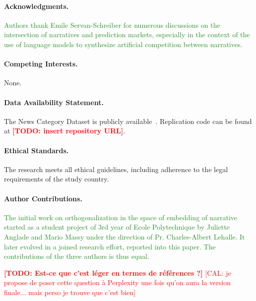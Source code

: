 \documentclass[
  journal=medium,
  manuscript=article-type,
  year=2025,
  volume=1,
]{cup-journal}
\newcommand{\TODO}[1]{\textcolor{red}{\textbf{[TODO: #1]}}}
\begin{document}
\paragraph{Acknowledgments.}
\textcolor{ForestGreen}{
Authors thank Emile Servan-Schreiber for numerous discussions on the intersection of narratives and prediction markets, especially in the context of the use of language models to synthesize artificial competition between narratives.
}

\paragraph{Competing Interests.}
None.

\paragraph{Data Availability Statement.}
The News Category Dataset is publicly available~\autocite{misra2022news}. Replication code can be found at \TODO{insert repository URL}.

\paragraph{Ethical Standards.}
The research meets all ethical guidelines, including adherence to the legal requirements of the study country.

\paragraph{Author Contributions.}
\textcolor{ForestGreen}{
The initial work on orthogonalization in the space of embedding of narrative started as a student project of 3rd year of Ecole Polytechnique by Juliette Anglade and Mario Massy under the direction of Pr. Charles-Albert Lehalle. It later evolved in a joined research effort, reported into this paper. The contributions of the three authors is thus equal.
}


\TODO{Est-ce que c'est léger en termes de références ?} \textcolor{red}{[CAL: je propose de poser cette question à Perplexity une fois qu'on aura la version finale... mais perso je trouve que c'est bien]}
\end{document}

